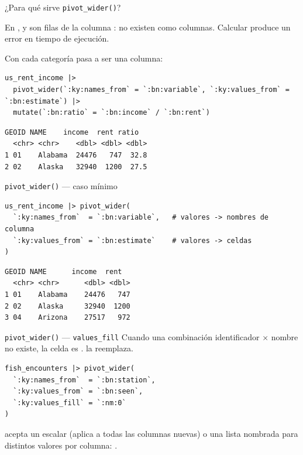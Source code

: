 \documentclass[8pt]{beamer}
\begin{document}
	\begin{frame}[fragile]{¿Para qué sirve \texttt{pivot\_wider()}?}
		\begin{alertblock}{}
			En ,  y  son filas de la columna : no existen como columnas. Calcular  produce un error en tiempo de ejecución.
		\end{alertblock}

		Con  cada categoría pasa a ser una columna:

		\begin{lstlisting}[style=RScript]
us_rent_income |>
  pivot_wider(`:ky:names_from` = `:bn:variable`, `:ky:values_from` = `:bn:estimate`) |>
  mutate(`:bn:ratio` = `:bn:income` / `:bn:rent`)
\end{lstlisting}
		\begin{lstlisting}[style=RConsole]
  GEOID NAME    income  rent ratio
  <chr> <chr>    <dbl> <dbl> <dbl>
1 01    Alabama  24476   747  32.8
2 02    Alaska   32940  1200  27.5
\end{lstlisting}
	\end{frame}

	\begin{frame}[fragile]{\texttt{pivot\_wider()} — caso mínimo}
		\begin{lstlisting}[style=RScript]
us_rent_income |> pivot_wider(
  `:ky:names_from`  = `:bn:variable`,   # valores -> nombres de columna
  `:ky:values_from` = `:bn:estimate`    # valores -> celdas
)
\end{lstlisting}
		\begin{lstlisting}[style=RConsole]
  GEOID NAME      income  rent
  <chr> <chr>      <dbl> <dbl>
1 01    Alabama    24476   747
2 02    Alaska     32940  1200
3 04    Arizona    27517   972
\end{lstlisting}
	\end{frame}

	\begin{frame}[fragile]{\texttt{pivot\_wider()} — \texttt{values\_fill}}
		Cuando una combinación identificador × nombre no existe, la celda es .  la reemplaza.

		\begin{lstlisting}[style=RScript]
fish_encounters |> pivot_wider(
  `:ky:names_from`  = `:bn:station`,
  `:ky:values_from` = `:bn:seen`,
  `:ky:values_fill` = `:nm:0`
)
\end{lstlisting}

		\begin{exampleblock}{}
			 acepta un escalar (aplica a todas las columnas nuevas) o una lista nombrada para distintos valores por columna: .
		\end{exampleblock}
	\end{frame}
\end{document}
